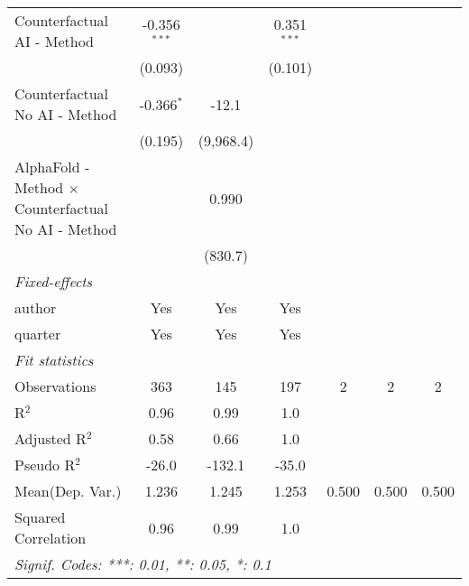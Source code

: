 \begin{tabular}{lcccccc}
   Counterfactual AI - Method                                 & -0.356$^{***}$ &              & 0.351$^{***}$  &     &     &   \\   
                                                              & (0.093)        &              & (0.101)        &     &     &   \\   
   Counterfactual No AI - Method                              & -0.366$^{*}$   & -12.1        &                &     &     &   \\   
                                                              & (0.195)        & (9,968.4)    &                &     &     &   \\   
   AlphaFold - Method $\times$ Counterfactual No AI - Method  &                & 0.990        &                &     &     &   \\   
                                                              &                & (830.7)      &                &     &     &   \\   
   \midrule
   \emph{Fixed-effects}\\
   author                                                     & Yes            & Yes          & Yes            &     &     & \\  
   quarter                                                    & Yes            & Yes          & Yes            &     &     & \\  
   \midrule
   \emph{Fit statistics}\\
   Observations                                               & 363            & 145          & 197            & 2   & 2   & 2\\  
   R$^2$                                                      & 0.96           & 0.99         & 1.0            &     &     & \\  
   Adjusted R$^2$                                             & 0.58           & 0.66         & 1.0            &     &     & \\  
   Pseudo R$^2$                                               & -26.0          & -132.1       & -35.0          &     &     & \\  
Mean(Dep. Var.) & 1.236 & 1.245 & 1.253 & 0.500 & 0.500 & 0.500 \\
   Squared Correlation                                        & 0.96           & 0.99         & 1.0            &     &     & \\  
   \midrule \midrule
   \multicolumn{7}{l}{\emph{Signif. Codes: ***: 0.01, **: 0.05, *: 0.1}}\\
\end{tabular}
\par\endgroup
